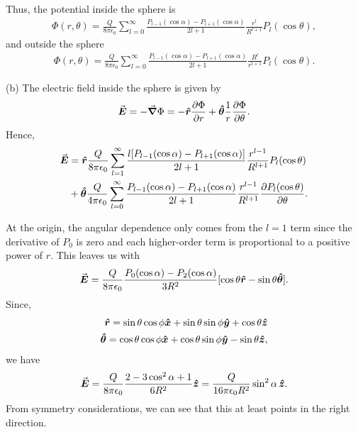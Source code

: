 {Thus, the potential inside the sphere is
\begin{eqnarray}
    \Phi(r,\theta) = \frac{Q}{8 \pi \epsilon_0} \sum_{l=0}^{\infty} \frac{P_{l-1}(\cos{\alpha}) - P_{l+1}(\cos{\alpha})}{2l+1} \frac{r^{l}}{R^{l+1}} P_{l}(\cos{\theta})
,\end{eqnarray}
and outside the sphere
\begin{eqnarray}
    \Phi(r,\theta) = \frac{Q}{8 \pi \epsilon_0} \sum_{l=0}^{\infty} \frac{P_{l-1}(\cos{\alpha}) - P_{l+1}(\cos{\alpha})}{2l + 1} \frac{R^{l}}{r^{l+1}} P_{l}(\cos{\theta})
.\end{eqnarray}

(b) The electric field inside the sphere is given by
\begin{eqnarray}
    \va*{E} = -\grad \Phi = -\vu*{r} \pdv{\Phi}{r} + \vu*{\theta} \frac{1}{r} \pdv{\Phi}{\theta}
.\end{eqnarray}
Hence,
\begin{align}
    \va*{E} &= \vu*{r} \frac{Q}{8 \pi \epsilon_0} \sum_{l=1}^{\infty} \frac{l [ P_{l-1}(\cos{\alpha}) - P_{l+1}(\cos{\alpha}) ]}{2l+1} \frac{r^{l-1}}{R^{l+1}} P_{l}(\cos{\theta}) \nonumber \\
    &+ \vu*{\theta} \frac{Q}{4 \pi \epsilon_0} \sum_{l=0}^{\infty} \frac{P_{l-1}(\cos{\alpha}) - P_{l+1}(\cos{\alpha})}{2l+1} \frac{r^{l-1}}{R^{l+1}} \pdv{P_{l}(\cos{\theta})}{\theta}
.\end{align}

At the origin, the angular dependence only comes from the $l=1$ term since the derivative of $P_{0}$ is zero and each higher-order term is proportional to a positive power of $r$.
This leaves us with
\begin{eqnarray}
    \va*{E} = \frac{Q}{8 \pi \epsilon_0} \frac{P_{0}(\cos{\alpha}) - P_{2}(\cos{\alpha})}{3 R^2} [ \cos{\theta}\vu*{r} - \sin{\theta} \vu*{\theta} ]
.\end{eqnarray}
Since,
\begin{eqnarray}
    \vu*{r} = \sin{\theta} \cos{\phi} \vu*{x} + \sin{\theta} \sin{\phi} \vu*{y} + \cos{\theta} \vu*{z} \\
    \vu*{\theta} = \cos{\theta} \cos{\phi} \vu*{x} + \cos{\theta} \sin{\phi} \vu*{y} - \sin{\theta} \vu*{z}
,\end{eqnarray}
we have
\begin{eqnarray}
    \va*{E} = \frac{Q}{8 \pi \epsilon_0} \frac{2 - 3\cos^2{\alpha} + 1}{6 R^2} \vu*{z} = \frac{Q}{16 \pi \epsilon_0 R^2} \sin^2{\alpha} \, \vu*{z}
.\end{eqnarray}
From symmetry considerations, we can see that this at least points in the right direction.

}
